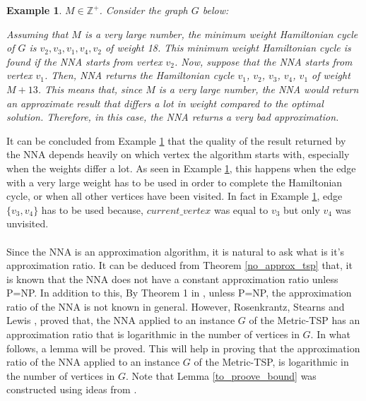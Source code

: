 \documentclass[12pt]{article}
\newtheorem{example}[definition]{Example}
\numberwithin{equation}{subsection}
\numberwithin{table}{subsection}
\numberwithin{algorithm}{subsection}
\numberwithin{figure}{subsection}
\begin{document}
\begin{example}
\label{nna_fail}
 $M \in \mathbb{Z}^+$. Consider the graph $G$ below:
\begin{center}
\end{center}
Assuming that $M$ is a very large number, the minimum weight Hamiltonian cycle of $G$ is $v_2, v_3, v_1, v_4, v_2$ of weight 18. This minimum weight Hamiltonian cycle is found if the NNA starts from vertex $v_2$. Now, suppose that the NNA starts from vertex $v_1$. Then, NNA returns the Hamiltonian cycle $v_1$, $v_2$, $v_3$, $v_4$, $v_1$ of weight $M + 13$. This means that, since $M$ is a very large number, the NNA would return an approximate result that differs a lot in weight compared to the optimal solution. Therefore, in this case, the NNA returns a very bad approximation.
\end{example}
It can be concluded from Example \ref{nna_fail} that the quality of the result returned by the NNA depends heavily on which vertex the algorithm starts with, especially when the weights differ a lot. As seen in Example \ref{nna_fail}, this happens when the edge with a very large weight has to be used in order to complete the Hamiltonian cycle, or when all other vertices have been visited. In fact in Example \ref{nna_fail}, edge $\{v_3, v_4\}$ has to be used because, $current\_vertex$ was equal to $v_3$ but only $v_4$ was unvisited.\\\\
Since the NNA is an approximation algorithm, it is natural to ask what is it's approximation ratio. It can be deduced from Theorem \ref{no_approx_tsp} that, it is known that the NNA does not have a constant approximation ratio unless P=NP. In addition to this, By Theorem 1 in \cite{chekuri_im_2011}, unless P=NP, the approximation ratio of the NNA is not known in general. However, Rosenkrantz, Stearns and Lewis \cite{Rosenkrantz}, proved that, the NNA applied to an instance $G$ of the Metric-TSP has an approximation ratio that is logarithmic in the number of vertices in $G$. In what follows, a lemma will be proved. This will help in proving that the approximation ratio of the NNA applied to an instance $G$ of the Metric-TSP, is logarithmic in the number of vertices in $G$. Note that Lemma \ref{to_proove_bound} was constructed using ideas from \cite{Rosenkrantz}.
\end{document}
